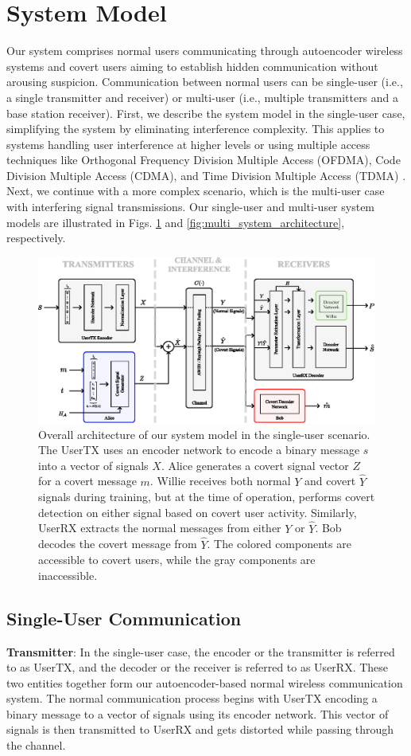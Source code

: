 \section{System Model}
\label{s:model}
Our system comprises normal users communicating through autoencoder wireless systems and covert users aiming to establish hidden communication without arousing suspicion. Communication between normal users can be single-user (i.e., a single transmitter and receiver) or multi-user (i.e., multiple transmitters and a base station receiver). First, we describe the system model in the single-user case, simplifying the system by eliminating interference complexity. This applies to systems handling user interference at higher levels or using multiple access techniques like Orthogonal Frequency Division Multiple Access (OFDMA), Code Division Multiple Access (CDMA), and Time Division Multiple Access (TDMA) \cite{WALRAND2000305}. Next, we continue with a more complex scenario, which is the multi-user case with interfering signal transmissions. Our single-user and multi-user system models are illustrated in Figs. \ref{fig:system_architecture} and \ref{fig:multi_system_architecture}, respectively.
\begin{figure}[thp]
	\center
	\includegraphics[width=.7\linewidth]{figs/system_architecture}
	\caption{Overall architecture of our system model in the single-user scenario. The UserTX uses an encoder network to encode a binary message $s$ into a vector of signals $X$. Alice generates a covert signal vector $Z$ for a covert message $m$. Willie receives both normal $Y$ and covert $\hat{Y}$ signals during training, but at the time of operation, performs covert detection on either signal based on covert user activity. Similarly, UserRX extracts the normal messages from either $Y$ or $\hat{Y}$. Bob decodes the covert message from $\hat{Y}$. The colored components are accessible to covert users, while the gray components are inaccessible.}	
	\label{fig:system_architecture}
\end{figure}

\subsection{Single-User Communication}
\textbf{Transmitter}: In the single-user case, the encoder or the transmitter is referred to as UserTX, and the decoder or the receiver is referred to as UserRX. These two entities together form our autoencoder-based normal wireless communication system. The normal communication process begins with UserTX encoding a binary message to a vector of signals using its encoder network. This vector of signals is then transmitted to UserRX and gets distorted while passing through the channel.

